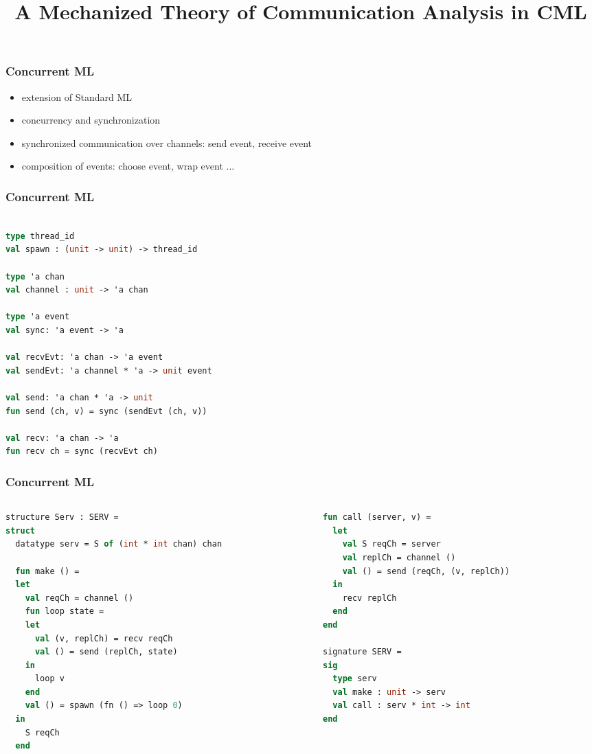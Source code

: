 \documentclass{beamer}
\title{A Mechanized Theory of Communication Analysis in CML}
\begin{document}
\begin{frame}
  \titlepage
\end{frame}

\begin{frame}
\frametitle{Concurrent ML}
\begin{itemize}
\item extension of Standard ML
\item concurrency and synchronization
\item synchronized communication over channels: send event, receive event
\item composition of events: choose event, wrap event ...
\end{itemize}
\end{frame}

\begin{frame}[fragile]
\frametitle{Concurrent ML}
\begin{lstlisting}[language=ML]

type thread_id
val spawn : (unit -> unit) -> thread_id

type 'a chan
val channel : unit -> 'a chan

type 'a event
val sync: 'a event -> 'a

val recvEvt: 'a chan -> 'a event
val sendEvt: 'a channel * 'a -> unit event

val send: 'a chan * 'a -> unit
fun send (ch, v) = sync (sendEvt (ch, v))

val recv: 'a chan -> 'a
fun recv ch = sync (recvEvt ch)

\end{lstlisting}
\end{frame}


\begin{frame}[fragile]
	\frametitle{Concurrent ML}
\begin{columns}
\begin{column}{0.5\textwidth}
\begin{lstlisting}[language=ML, mathescape]
structure Serv : SERV =
struct 
  datatype serv = S of (int * int chan) chan

  fun make () =
  let 
    val reqCh = channel ()
    fun loop state =
    let
      val (v, replCh) = recv reqCh
      val () = send (replCh, state)
    in
      loop v
    end
    val () = spawn (fn () => loop 0)
  in
    S reqCh
  end 
\end{lstlisting}
\end{column}


\begin{column}{0.5\textwidth}
\begin{lstlisting}[language=ML, mathescape]
  fun call (server, v) =
  let 
    val S reqCh = server
    val replCh = channel () 
    val () = send (reqCh, (v, replCh))
  in
    recv replCh
  end
end

signature SERV =
sig 
  type serv
  val make : unit -> serv
  val call : serv * int -> int
end
\end{lstlisting}
\end{column}
\end{columns}
\end{frame}
\end{document}
